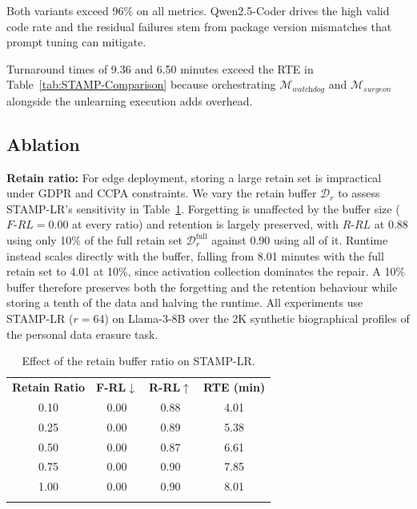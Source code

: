 Both variants exceed 96\% on all metrics. Qwen2.5-Coder drives the high valid code rate and the residual failures stem from package version mismatches that prompt tuning can mitigate.

Turnaround times of 9.36 and 6.50 minutes exceed the RTE in Table~\ref{tab:STAMP-Comparison} because orchestrating $\mathcal{M}_{\textit{watchdog}}$ and $\mathcal{M}_{\textit{surgeon}}$ alongside the unlearning execution adds overhead.

\subsection{Ablation}
\noindent

\textbf{Retain ratio:}
For edge deployment, storing a large retain set is impractical under GDPR and CCPA constraints. We vary the retain buffer $\mathcal{D}_r$ to assess STAMP-LR's sensitivity in Table~\ref{tab:retain_ratio}. Forgetting is unaffected by the buffer size ($F\text{-}RL = 0.00$ at every ratio) and retention is largely preserved, with $R\text{-}RL$ at 0.88 using only 10\% of the full retain set $\mathcal{D}_r^{\mathrm{full}}$ against 0.90 using all of it. Runtime instead scales directly with the buffer, falling from 8.01 minutes with the full retain set to 4.01 at 10\%, since activation collection dominates the repair. A 10\% buffer therefore preserves both the forgetting and the retention behaviour while storing a tenth of the data and halving the runtime. All experiments use STAMP-LR ($r = 64$) on Llama-3-8B over the 2K synthetic biographical profiles of the personal data erasure task.

\begin{table}[htbp]
\centering
\caption{Effect of the retain buffer ratio on STAMP-LR.}
\label{tab:retain_ratio}
\small
\renewcommand{\arraystretch}{1.3}
\begin{tabular}{c|ccc}
\Xhline{1.15pt}
\textbf{Retain Ratio} & \textbf{F-RL}$\downarrow$ & \textbf{R-RL}$\uparrow$ & \textbf{RTE (min)} \\
\Xhline{1.15pt}
0.10 & 0.00 & 0.88 & 4.01 \\
\rowcolor{gray!15}
0.25 & 0.00 & 0.89 & 5.38 \\
0.50 & 0.00 & 0.87 & 6.61 \\
\rowcolor{gray!15}
0.75 & 0.00 & 0.90 & 7.85 \\
1.00 & 0.00 & 0.90 & 8.01 \\
\Xhline{1.15pt}
\end{tabular}
\end{table}

